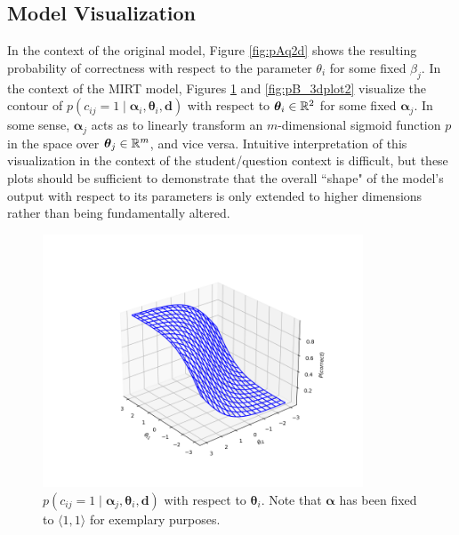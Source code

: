 \documentclass[10pt]{article}
\renewcommand{\bf}[1]{\mathbf{#1}}
\begin{document}
\subsection*{Model Visualization}

In the context of the original model, Figure \ref{fig:pAq2d} shows the resulting probability of correctness with respect to the parameter $\theta_i$ for some fixed $\beta_j$.
\spacer
In the context of the MIRT model, Figures \ref{fig:pB_3dplot1} and \ref{fig:pB_3dplot2} visualize the contour of $p(c_{ij} = 1\mid \bm\alpha_i,\bm\theta_i,\bf d)$ with respect to $\bm \theta_i\in{\mathbb R}^2$ for some fixed $\bm \alpha_j$. In some sense, $\bm \alpha_j$ acts as to linearly transform an $m$-dimensional sigmoid function $p$ in the space over $\bm\theta_j\in{\mathbb R}^m$, and vice versa. Intuitive interpretation of this visualization in the context of the student/question context is difficult, but these plots should be sufficient to demonstrate that the overall ``shape" of the model's output with respect to its parameters is only extended to higher dimensions rather than being fundamentally altered.

\begin{figure}[h!]
    \centering
    \includegraphics[width=0.85\textwidth]{final/3dplot.png}
    \caption{$p(c_{ij} = 1\mid \bm\alpha_j,\bm\theta_i,\bf d)$ with respect to $\bm \theta_i$. Note that $\bm\alpha$ has been fixed to $\langle 1, 1 \rangle$ for exemplary purposes.}
    \label{fig:pB_3dplot1}
\end{figure}
\end{document}
